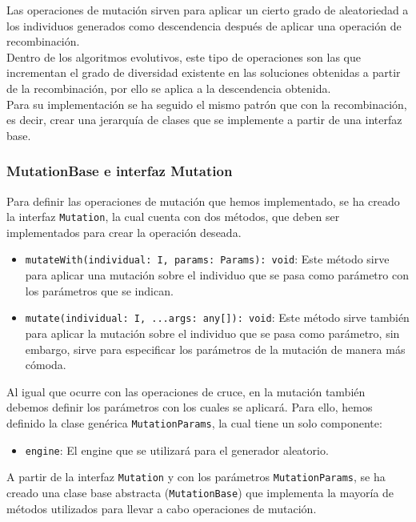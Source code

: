 Las operaciones de mutación sirven para aplicar un cierto grado de aleatoriedad a los individuos generados como descendencia después de aplicar una operación de recombinación. \\

Dentro de los algoritmos evolutivos, este tipo de operaciones son las que incrementan el grado de diversidad existente en las soluciones obtenidas a partir de la recombinación, por ello se aplica a la descendencia obtenida. \\

Para su implementación se ha seguido el mismo patrón que con la recombinación, es decir, crear una jerarquía de clases que se implemente a partir de una interfaz base.

\subsubsection{MutationBase e interfaz Mutation}

Para definir las operaciones de mutación que hemos implementado, se ha creado la interfaz \texttt{Mutation}, la cual cuenta con dos métodos, que deben ser implementados para crear la operación deseada.

\begin{itemize}
    \item \texttt{mutateWith(individual: I, params: Params): void}: Este método sirve para aplicar una mutación sobre el individuo que se pasa como parámetro con los parámetros que se indican.
    \item \texttt{mutate(individual: I, ...args: any[]): void}: Este método sirve también para aplicar la mutación sobre el individuo que se pasa como parámetro, sin embargo, sirve para especificar los parámetros de la mutación de manera más cómoda.
\end{itemize}

Al igual que ocurre con las operaciones de cruce, en la mutación también debemos definir los parámetros con los cuales se aplicará. Para ello, hemos definido la clase genérica \texttt{MutationParams}, la cual tiene un solo componente:

\begin{itemize}
    \item \texttt{engine}: El engine que se utilizará para el generador aleatorio.
\end{itemize}

A partir de la interfaz \texttt{Mutation} y con los parámetros \texttt{MutationParams}, se ha creado una clase base abstracta (\texttt{MutationBase}) que implementa la mayoría de métodos utilizados para llevar a cabo operaciones de mutación.\\

